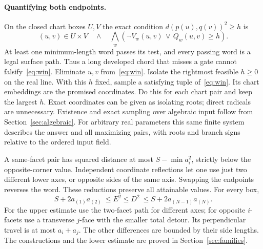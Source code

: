 \documentclass[10pt,letterpaper]{article}
\begin{document}
\paragraph{Quantifying both endpoints.}
On the closed chart boxes $U,V$ the exact condition $d(p(u),q(v))^2\ge h$ is
\begin{equation}\label{eq:win}
 (u,v)\in U\times V\quad\wedge\quad
    \bigwedge_w(\neg V_w(u,v)\,\vee\,Q_w(u,v)\ge h).
\end{equation}
At least one minimum-length word passes its test, and every passing word is a legal surface path. Thus a long developed chord that misses a gate cannot falsify~\eqref{eq:win}. Eliminate $u,v$ from~\eqref{eq:win}. Isolate the rightmost feasible $h\ge0$ on the real line. With this $h$ fixed, sample a satisfying tuple of~\eqref{eq:win}. Its chart embeddings are the promised coordinates. Do this for each chart pair and keep the largest $h$. Exact coordinates can be given as isolating roots; direct radicals are unnecessary. Existence and exact sampling over algebraic input follow from Section~\ref{sec:algebraic}. For arbitrary real parameters this same finite system describes the answer and all maximizing pairs, with roots and branch signs relative to the ordered input field.
\par A same-facet pair has squared distance at most $S-\min a_i^2$, strictly below the opposite-corner value. Independent coordinate reflections let one use just two different lower axes, or opposite sides of the same axis. Swapping the endpoints reverses the word. These reductions preserve all attainable values. For every box,
\begin{equation}\label{eq:sandwich}
   S+2a_{(1)}a_{(2)}\ \le E^2\le D^2\ \le S+2a_{(N-1)}a_{(N)}.
\end{equation}
For the upper estimate use the two-facet path for different axes; for opposite $i$-facets use a transverse $j$-face with the smaller total detour. Its perpendicular travel is at most $a_i+a_j$. The other differences are bounded by their side lengths. The constructions and the lower estimate are proved in Section~\ref{sec:families}.
\end{document}

